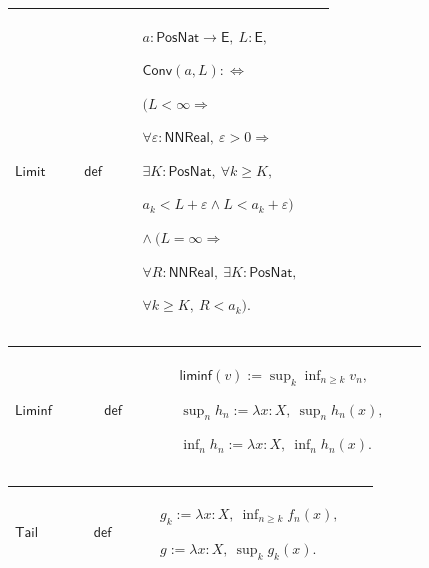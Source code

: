 \documentclass[12pt,reqno]{amsart}
\theoremstyle{blueplain}
\numberwithin{equation}{section}
\begin{document}
{\scriptsize \setlength{\parskip}{0pt}\nointerlineskip
\noindent 
\begin{tabular}{|@{}>{\centering\arraybackslash}m{0.19251\linewidth}|>{\centering\arraybackslash}m{0.16845\linewidth}|>{\centering\arraybackslash}m{0.53904\linewidth}|}
\hline
\hypertarget{def:Limit}{$\displaystyle \mathsf{Limit}$} & $\displaystyle 
\mathsf{def}$ & $\displaystyle a:\mathsf{PosNat}\to\mathsf{E},\ L:\mathsf{E}%
, $\par$\displaystyle \mathsf{Conv}(a,L):\Longleftrightarrow$\par$%
\displaystyle \bigl(L<\infty\Rightarrow$\par$\displaystyle %
\forall\varepsilon:\mathsf{NNReal},\ \varepsilon>0\Rightarrow$\par$%
\displaystyle \exists K:\mathsf{PosNat},\ \forall k\ge K,$\par$\displaystyle %
a_k<L+\varepsilon\land L<a_k+\varepsilon\bigr)$\par$\displaystyle \land\ %
\bigl(L=\infty\Rightarrow$\par$\displaystyle \forall R:\mathsf{NNReal},\
\exists K:\mathsf{PosNat},$\par$\displaystyle \forall k\ge K,\ R<a_k\bigr).$
\\ \hline
\end{tabular}%
}

{\scriptsize \setlength{\parskip}{0pt}\nointerlineskip
\noindent 
\begin{tabular}{|@{}>{\centering\arraybackslash}m{0.19251\linewidth}|>{\centering\arraybackslash}m{0.16845\linewidth}|>{\centering\arraybackslash}m{0.53904\linewidth}|}
\hline
\hypertarget{def:Liminf}{$\displaystyle \mathsf{Liminf}$} & $\displaystyle 
\mathsf{def}$ & $\displaystyle \mathsf{liminf}(v):=\sup_k\inf_{n\ge k}v_n,$%
\par$\displaystyle \sup_nh_n:=\lambda x:X,\ \sup_nh_n(x),$\par$\displaystyle %
\inf_nh_n:=\lambda x:X,\ \inf_nh_n(x).$ \\ \hline
\end{tabular}%
}

{\scriptsize \setlength{\parskip}{0pt}\nointerlineskip
\noindent 
\begin{tabular}{|@{}>{\centering\arraybackslash}m{0.19251\linewidth}|>{\centering\arraybackslash}m{0.16845\linewidth}|>{\centering\arraybackslash}m{0.53904\linewidth}|}
\hline
\hypertarget{def:Tail}{$\displaystyle \mathsf{Tail}$} & $\displaystyle 
\mathsf{def}$ & $\displaystyle g_k:=\lambda x:X,\ \inf_{n\ge k}f_n(x),$\par$%
\displaystyle g:=\lambda x:X,\ \sup_k g_k(x).$ \\ \hline
\end{tabular}%
}
\end{document}
